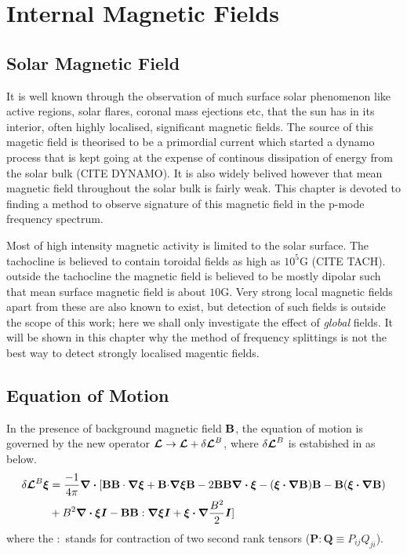 \chapter{Internal Magnetic Fields}

\section{Solar Magnetic Field}\label{mag_intro}

It is well known through the observation of much surface solar phenomenon like active regions, solar flares, coronal mass ejections etc, that the sun has in its interior, often highly localised, significant magnetic fields. The source of this magetic field is theorised to be a primordial current which started a dynamo process that is kept going at the expense of continous dissipation of energy from the solar bulk (CITE DYNAMO). It is also widely belived however that mean magnetic field throughout the solar bulk is fairly weak. This chapter is devoted to finding a method to observe signature of this magnetic field in the p-mode frequency spectrum.

Most of high intensity magnetic activity is limited to the solar surface. The tachocline is believed to contain toroidal fields as high as $10^5 \text{G}$ (CITE TACH). outside the tachocline the magnetic field is believed to be mostly dipolar such that mean surface magnetic field is about $10\text{G}$. Very strong local magnetic fields apart from these are also known to exist, but detection of such fields is outside the scope of this work; here we shall only investigate the effect of \textit{global} fields. It will be shown in this chapter why the method of frequency splittings is not the best way to detect strongly localised magentic fields.

\section{Equation of Motion}

In the presence of background magnetic field $\mathbf{B}$, the equation of motion is governed by the new operator $\bm{\mathcal{L}} \rightarrow \bm{\mathcal{L}} + \delta \bm{\mathcal{L}}^{B}$, where $\delta \bm{\mathcal{L}}^B$ is estabished in \cite{hanasoge17} as below.
\begin{align}
    \delta \bm{\mathcal{L}}^{B} \boldsymbol{\xi} &= \frac{-1}{4\pi}\boldsymbol{\nabla \cdot} [\mathbf{B}\mathbf{B}\cdot \boldsymbol{\nabla} \boldsymbol{\xi} + \mathbf{B} {\cdot} \boldsymbol{\nabla}\boldsymbol{\xi}\mathbf{B} - 2 \mathbf{B}\mathbf{B}\boldsymbol{\nabla \cdot}\boldsymbol{\xi} - (\boldsymbol{\xi \cdot \nabla} \mathbf{B})\mathbf{B} - \mathbf{B}(\boldsymbol{\xi \cdot \nabla}\mathbf{B})\notag
    \\& + B^2 \boldsymbol{\nabla \cdot \xi I} - \mathbf{B}\mathbf{B} :\boldsymbol{\nabla \xi I} + \boldsymbol{\xi \cdot \nabla}\frac{B^2}{2}\boldsymbol{I}] 
     \label{eqn: mag_pert_op}
\end{align}
where the $:$ stands for contraction of two second rank tensors ($\mathbf{P}:\mathbf{Q} \equiv P_{ij}Q_{ji} $).

